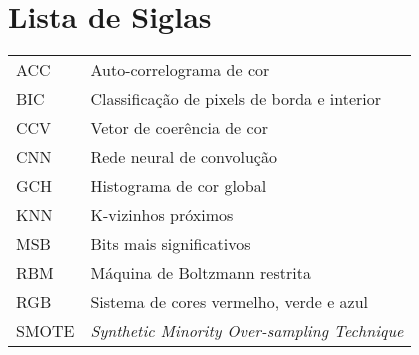 \chapter*{Lista de Siglas}

\begin{tabular}{l l}
ACC  & Auto-correlograma de cor\\
BIC  & Classificação de pixels de borda e interior\\
CCV  & Vetor de coerência de cor\\
CNN  & Rede neural de convolução\\
GCH  & Histograma de cor global\\
KNN  & K-vizinhos próximos\\
MSB  & Bits mais significativos\\
RBM  & Máquina de Boltzmann restrita\\
RGB  & Sistema de cores vermelho, verde e azul\\
SMOTE  &  \textit{Synthetic Minority Over-sampling Technique} \\
\end{tabular}